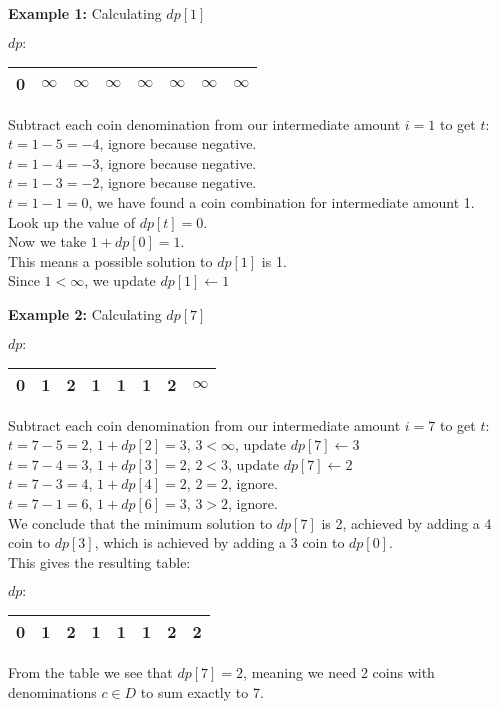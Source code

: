 \textbf{Example 1:} Calculating $dp[1]$
\begin{table}[H]
    \centering
    $dp:$
    \begin{tabular}{|c|c|c|c|c|c|c|c|}
        \hline
        0 & $\infty$ & $\infty$ & $\infty$ & $\infty$ & $\infty$ & $\infty$ & $\infty$ \\
        \hline
    \end{tabular}
\end{table}
Subtract each coin denomination from our intermediate amount $i=1$ to get $t$:
$t = 1-5 = -4$, ignore because negative.\\
$t = 1-4 = -3$, ignore because negative.\\
$t = 1-3 = -2$, ignore because negative.\\
$t = 1-1 = 0$, we have found a coin combination for intermediate amount 1.\\
Look up the value of $dp[t] = 0$.\\
Now we take $1 + dp[0] = 1$.\\
This means a possible solution to $dp[1]$ is 1.\\
Since $1 < \infty$, we update $dp[1] \leftarrow 1$

\textbf{Example 2:} Calculating $dp[7]$
\begin{table}[H]
    \centering
    $dp:$
    \begin{tabular}{|c|c|c|c|c|c|c|c|}
        \hline
        0 & 1 & 2 & 1 & 1 & 1 & 2 & $\infty$ \\
        \hline
    \end{tabular}
\end{table}
Subtract each coin denomination from our intermediate amount $i=7$ to get $t$:\\
$t = 7-5 = 2$, $1 + dp[2] = 3$, $3 < \infty$, update $dp[7] \leftarrow 3$\\
$t = 7-4 = 3$, $1+dp[3] = 2$, $2 < 3$, update $dp[7] \leftarrow 2$\\
$t = 7-3 = 4$, $1+dp[4] = 2$, $2 = 2$, ignore.\\
$t = 7-1 = 6$, $1+dp[6] = 3$, $3 > 2$, ignore.\\

We conclude that the minimum solution to $dp[7]$ is 2, achieved by adding a 4 coin to $dp[3]$, which is achieved by adding a 3 coin to $dp[0]$.\\
This gives the resulting table:
\begin{table}[H]
    \centering
    $dp:$
    \begin{tabular}{|c|c|c|c|c|c|c|c|}
        \hline
        0 & 1 & 2 & 1 & 1 & 1 & 2 & 2 \\
        \hline
    \end{tabular}
\end{table}
From the table we see that $dp[7] = 2$, meaning we need 2 coins with denominations $c\in D$ to sum exactly to 7.\\

